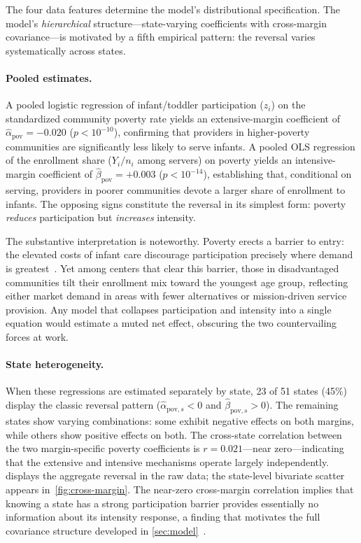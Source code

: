 The four data features determine the model's distributional
specification.  The model's \emph{hierarchical} structure---state-varying
coefficients with cross-margin covariance---is motivated by a fifth
empirical pattern: the reversal varies systematically across
states.

\paragraph{Pooled estimates.}
A pooled logistic regression of infant/toddler participation ($z_i$) on
the standardized community poverty rate yields an extensive-margin
coefficient of $\hat{\alpha}_{\mathrm{pov}} = -0.020$
($p < 10^{-10}$), confirming that providers in higher-poverty
communities are significantly less likely to serve infants.  A pooled OLS
regression of the enrollment share ($Y_i/n_i$ among servers) on poverty
yields an intensive-margin coefficient of
$\hat{\beta}_{\mathrm{pov}} = +0.003$ ($p < 10^{-14}$), establishing
that, conditional on serving, providers in poorer communities devote a
larger share of enrollment to infants.  The opposing signs constitute the
reversal in its simplest form: poverty \emph{reduces}
participation but \emph{increases} intensity.

The substantive interpretation is noteworthy.  Poverty erects a barrier to
entry: the elevated costs of infant care discourage participation
precisely where demand is greatest~\citep{DobbinsEtAl2016,
MalikEtAl2018}.  Yet among centers that clear this barrier, those in
disadvantaged communities tilt their enrollment mix toward the youngest
age group, reflecting either market demand in areas with fewer
alternatives or mission-driven service provision.  Any model that
collapses participation and intensity into a single equation would
estimate a muted net effect, obscuring the two countervailing forces at
work.

\paragraph{State heterogeneity.}
When these regressions are estimated separately by state, 23 of 51
states (45\%) display the classic reversal pattern
($\hat{\alpha}_{\mathrm{pov},s} < 0$ and
$\hat{\beta}_{\mathrm{pov},s} > 0$).  The remaining states show varying
combinations: some exhibit negative effects on both margins, while
others show positive effects on both.  The cross-state correlation
between the two margin-specific poverty coefficients is $r = 0.021$---near
zero---indicating that the extensive and intensive mechanisms operate
largely independently.   displays the aggregate reversal
in the raw data; the state-level bivariate scatter appears
in~\cref{fig:cross-margin}.  The near-zero cross-margin correlation implies
that knowing a state has a strong participation barrier provides
essentially no information about its intensity response, a finding that
motivates the full covariance structure developed in
\cref{sec:model}~\citep{SippleEtAl2020}.

